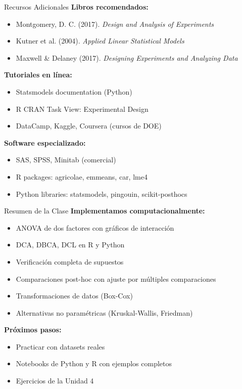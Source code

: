 \documentclass[aspectratio=169]{beamer}
\begin{document}
\begin{frame}{Recursos Adicionales}
\textbf{Libros recomendados:}
\begin{itemize}
\item Montgomery, D. C. (2017). \textit{Design and Analysis of Experiments}
\item Kutner et al. (2004). \textit{Applied Linear Statistical Models}
\item Maxwell \& Delaney (2017). \textit{Designing Experiments and Analyzing Data}
\end{itemize}

\vspace{0.3cm}

\textbf{Tutoriales en línea:}
\begin{itemize}
\item Statsmodels documentation (Python)
\item R CRAN Task View: Experimental Design
\item DataCamp, Kaggle, Coursera (cursos de DOE)
\end{itemize}

\vspace{0.3cm}

\textbf{Software especializado:}
\begin{itemize}
\item SAS, SPSS, Minitab (comercial)
\item R packages: agricolae, emmeans, car, lme4
\item Python libraries: statsmodels, pingouin, scikit-posthocs
\end{itemize}
\end{frame}

\begin{frame}{Resumen de la Clase}
\textbf{Implementamos computacionalmente:}
\begin{itemize}
\item ANOVA de dos factores con gráficos de interacción
\item DCA, DBCA, DCL en R y Python
\item Verificación completa de supuestos
\item Comparaciones post-hoc con ajuste por múltiples comparaciones
\item Transformaciones de datos (Box-Cox)
\item Alternativas no paramétricas (Kruskal-Wallis, Friedman)
\end{itemize}

\vspace{0.3cm}

\textbf{Próximos pasos:}
\begin{itemize}
\item Practicar con datasets reales
\item Notebooks de Python y R con ejemplos completos
\item Ejercicios de la Unidad 4
\end{itemize}
\end{frame}
\end{document}
